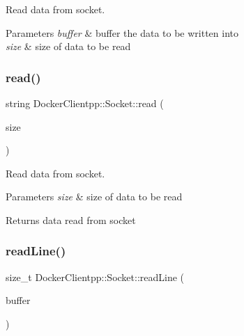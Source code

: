 Read data from socket. 


\begin{DoxyParams}{Parameters}
{\em buffer} & buffer the data to be written into \\
\hline
{\em size} & size of data to be read \\
\hline
\end{DoxyParams}
\mbox{\label{classDockerClientpp_1_1Socket_a271a149d410a61edcd4630ad9b8897fc}} 
\subsubsection{\texorpdfstring{read()}{read()}\hspace{0.1cm}{\footnotesize\ttfamily [2/2]}}
{\footnotesize\ttfamily string Docker\+Clientpp\+::\+Socket\+::read (\begin{DoxyParamCaption}\item[{size\+\_\+t}]{size }\end{DoxyParamCaption})}



Read data from socket. 


\begin{DoxyParams}{Parameters}
{\em size} & size of data to be read \\
\hline
\end{DoxyParams}
\begin{DoxyReturn}{Returns}
data read from socket 
\end{DoxyReturn}
\mbox{\label{classDockerClientpp_1_1Socket_a4ad626569261159c8bfe161799a3670f}} 
\subsubsection{\texorpdfstring{readLine()}{readLine()}\hspace{0.1cm}{\footnotesize\ttfamily [1/2]}}
{\footnotesize\ttfamily size\+\_\+t Docker\+Clientpp\+::\+Socket\+::read\+Line (\begin{DoxyParamCaption}\item[{char $\ast$}]{buffer }\end{DoxyParamCaption})}



